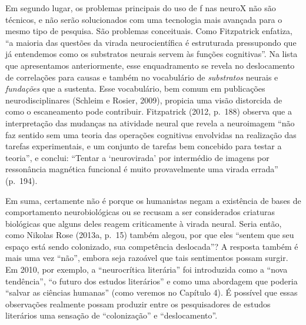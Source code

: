 Em segundo lugar, os problemas principais do uso de f nas neuroX não
são técnicos, e não serão solucionados com uma tecnologia mais avançada
para o mesmo tipo de pesquisa. São problemas conceituais. Como
Fitzpatrick enfatiza, ``a maioria das questões da virada
neurocientífica é estruturada pressupondo que já entendemos como os
substratos neurais servem às funções cognitivas''. Na lista que
apresentamos anteriormente, esse enquadramento se revela no deslocamento
de correlações para causas e também no vocabulário de \emph{substratos}
neurais e \emph{fundações} que a sustenta. Esse vocabulário, bem comum
em publicações neurodisciplinares (Schleim e Rosier, 2009), propicia uma
visão distorcida de como o escaneamento pode contribuir. Fitzpatrick
(2012, p.~188) observa que a interpretação das mudanças na atividade
neural que revela a neuroimagem ``não faz sentido sem uma teoria das
operações cognitivas envolvidas na realização das tarefas experimentais,
e um conjunto de tarefas bem concebido para testar a teoria'', e
conclui: ``Tentar a `neurovirada' por intermédio de imagens por
ressonância magnética funcional é muito provavelmente uma virada
errada'' (p.~194).

Em suma, certamente não é porque os humanistas negam a existência de
bases de comportamento neurobiológicas ou se recusam a ser considerados
criaturas biológicas que alguns deles reagem criticamente à virada
neural. Seria então, como Nikolas Rose (2013a, p.~15) também alegou, por
que eles ``sentem que seu espaço está sendo colonizado, sua competência
deslocada''? A resposta também é mais uma vez ``não'', embora seja
razoável que tais sentimentos possam surgir. Em 2010, por exemplo, a
``neurocrítica literária'' foi introduzida como a ``nova tendência'', ``o futuro dos estudos literários'' e como uma abordagem
que poderia ``salvar as ciências humanas'' (como veremos no Capítulo 4).
É possível que essas observações realmente possam produzir entre os
pesquisadores de estudos literários uma sensação de ``colonização'' e
``deslocamento''.

